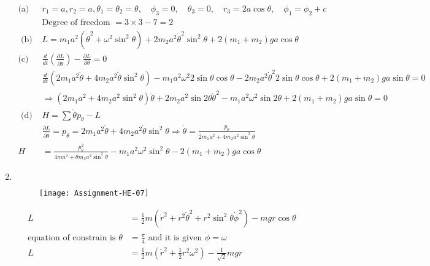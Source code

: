 \begin{enumerate}
\begin{answer}
\begin{align*}
		\text{(a) }&r_{1}=a, r_{2}=a, \theta_{1}=\theta_{2}=\theta, \quad \phi_{3}=0, \quad \theta_{3}=0, \quad r_{3}=2 a \cos \theta, \quad \phi_{1}=\phi_{2}+c\\
		&\text{Degree of freedom }=3 \times 3-7=2\\
	\text{	(b) }&L=m_{1} a^{2}\left(\dot{\theta}^{2}+\omega^{2} \sin ^{2} \theta\right)+2 m_{2} a^{2} \dot{\theta}^{2} \sin ^{2} \theta+2\left(m_{1}+m_{2}\right) g a \cos \theta\\
		\text{(c) }&\frac{d}{d t}\left(\frac{\partial L}{\partial \dot{\theta}}\right)-\frac{\partial L}{\partial \theta}=0\\
		&\frac{d}{d t}\left(2 m_{1} a^{2} \dot{\theta}+4 m_{2} a^{2} \dot{\theta} \sin ^{2} \theta\right)-m_{1} a^{2} \omega^{2} 2 \sin \theta \cos \theta-2 m_{2} a^{2} \dot{\theta}^{2} 2 \sin \theta \cos \theta+2\left(m_{1}+m_{2}\right) g a \sin \theta=0\\
		&\Rightarrow\left(2 m_{1} a^{2}+4 m_{2} a^{2} \sin ^{2} \theta\right) \ddot{\theta}+2 m_{2} a^{2} \sin 2 \theta \dot{\theta}^{2}-m_{1} a^{2} \omega^{2} \sin 2 \theta+2\left(m_{1}+m_{2}\right) g a \sin \theta=0\\
	\text{	(d) }&H=\sum \dot{\theta} p_{\theta}-L\\
	&\frac{\partial L}{\partial \dot{\theta}}=p_{\theta}=2 m_{1} a^{2} \dot{\theta}+4 m_{2} a^{2} \dot{\theta} \sin ^{2} \theta \Rightarrow \dot{\theta}=\frac{p_{\theta}}{2 m_{1} a^{2}+4 m_{2} a^{2} \sin ^{2} \theta}\\
	H&=\frac{p_{\theta}^{2}}{4 m a^{2}+\theta m_{2} a^{2} \sin ^{2} \theta}-m_{1} a^{2} \omega^{2} \sin ^{2} \theta-2\left(m_{1}+m_{2}\right) g a \cos \theta
		\end{align*}
	\end{answer}
	\item $\left. \right. $
	 \begin{figure}[H]
		\centering
		\texttt{[image: Assignment-HE-07]}
	\end{figure}
	\begin{answer}
		\begin{align*}
		L&=\frac{1}{2} m\left(\dot{r}^{2}+r^{2} \dot{\theta}^{2}+r^{2} \sin ^{2} \theta \dot{\phi}^{2}\right)-m g r \cos \theta\\
		\text{equation of constrain is }\theta&=\frac{\pi}{4}\text{ and it is given }\dot{\phi}=\omega\\
		L&=\frac{1}{2} m\left(\dot{r}^{2}+\frac{1}{2} r^{2} \omega^{2}\right)-\frac{1}{\sqrt{2}} m g r\\

\end{align*}
\end{answer}
\end{enumerate}

